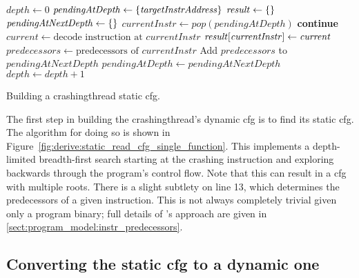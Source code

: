 \begin{sanefig}
\begin{algorithmic}[1]
\State $\mathit{depth} \gets 0$
\State $\mathit{pendingAtDepth} \gets \{\mathit{targetInstrAddress}\}$
\State $\mathit{result} \gets \{\}$
  \State $\mathit{pendingAtNextDepth} \gets \{\}$
    \State $\mathit{currentInstr} \gets \mathit{pop}(\mathit{pendingAtDepth})$
      \State \textbf{continue}
    \EndIf
    \State $\mathit{current} \gets \text{decode instruction at } \mathit{currentInstr}$
    \State $\mathit{result}[\mathit{currentInstr}] \gets \mathit{current}$
    \State $\mathit{predecessors} \gets \text{predecessors of } \mathit{currentInstr}$
    \State Add $\mathit{predecessors}$ to $\mathit{pendingAtNextDepth}$
  \EndWhile
  \State $\mathit{pendingAtDepth} \gets \mathit{pendingAtNextDepth}$
  \State $\mathit{depth} \gets \mathit{depth} + 1$
\EndWhile
\end{algorithmic}
\vspace{-6pt}
\caption{Building a \gls{crashingthread} static \gls{cfg}.}
\label{fig:derive:static_read_cfg_single_function}
\end{sanefig}

\noindent
The first step in building the \gls{crashingthread}'s dynamic
\gls{cfg} is to find its static \gls{cfg}.  The algorithm for doing so
is shown in Figure~\ref{fig:derive:static_read_cfg_single_function}.
This implements a depth-limited breadth-first search starting at the
crashing instruction and exploring backwards through the program's
control flow.  Note that this can result in a \gls{cfg} with multiple
roots.  There is a slight subtlety on line 13, which determines the
predecessors of a given instruction.  This is not always completely
trivial given only a program binary; full details of {\technique}'s
approach are given in \autoref{sect:program_model:instr_predecessors}.

\subsection[Converting the static \glsentrytext{cfg} to a dynamic one]{Converting the static \gls{cfg} to a dynamic one}
\label{sect:derive:handling_loops}

